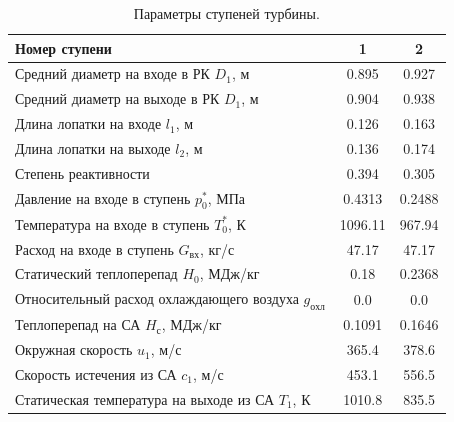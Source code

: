 \documentclass[a4paper,12pt]{article}
\begin{document}
    
    \begin{longtable}{
    |p{8cm}|
%    
    c|
%    
    c|
%    
    }
        \caption{Параметры ступеней турбины.} \\ \hline
        Номер ступени
%        
        & 1
%        
        & 2
%        
        \\ \hline
        Средний диаметр на входе в РК $D_1$, м
%        
        & 0.895
%        
        & 0.927
%        
        \\ \hline
        Средний диаметр на выходе в РК $D_1$, м
%        
        & 0.904
%        
        & 0.938
%        
        \\ \hline
        Длина лопатки на входе  $l_1$, м
%        
        & 0.126
%        
        & 0.163
%        
        \\ \hline
        Длина лопатки на выходе  $l_2$, м
%        
        & 0.136
%        
        & 0.174
%        
        \\ \hline
        Степень реактивности
%        
        & 0.394
%        
        & 0.305
%        
        \\ \hline
        Давление на входе в ступень $p_0^*$, МПа
%        
        & 0.4313
%        
        & 0.2488
%        
        \\ \hline
        Температура на входе в ступень $T_0^*$, К
%        
        & 1096.11
%        
        & 967.94
%        
        \\ \hline
        Расход на входе в ступень $G_{вх}$, кг/с
%        
        & 47.17
%        
        & 47.17
%        
        \\ \hline
        Статический теплоперепад $H_0$, МДж/кг
%        
        & 0.18
%        
        & 0.2368
%        
        \\ \hline
        Относительный расход охлаждающего воздуха $g_{охл}$
%        
        & 0.0
%        
        & 0.0
%        
        \\ \hline
        Теплоперепад на СА $H_с$, МДж/кг
%        
        & 0.1091
%        
        & 0.1646
%        
        \\ \hline
        Окружная скорость $u_1$, м/с
%        
        & 365.4
%        
        & 378.6
%        
        \\ \hline
        Скорость истечения из СА $c_1$, м/с
%        
        & 453.1
%        
        & 556.5
%        
        \\ \hline
        Статическая температура на выходе из СА $T_1$, К
%        
        & 1010.8
%        
        & 835.5

\end{longtable}
\end{document}
